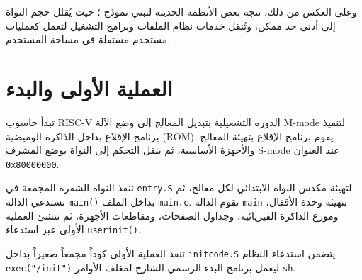 وعلى العكس من ذلك، تتجه بعض الأنظمة الحديثة لتبني نموذج ؛
حيث يُقلل حجم النواة إلى أدنى حد ممكن، وتُنقل خدمات نظام الملفات وبرامج التشغيل لتعمل كعمليات مستخدم مستقلة في مساحة المستخدم.

\section{العملية الأولى والبدء}

تبدأ حاسوب RISC-V الدورة التشغيلية بتبديل المعالج إلى وضع الآلة M-mode لتنفيذ برنامج الإقلاع بداخل الذاكرة الوميضية (ROM).
يقوم برنامج الإقلاع بتهيئة المعالج والأجهزة الأساسية، ثم ينقل التحكم إلى النواة بوضع المشرف S-mode عند العنوان \texttt{0x80000000}.

تنفذ النواة الشفرة المجمعة في \texttt{entry.S} لتهيئة مكدس النواة الابتدائي لكل معالج،
ثم تستدعي الدالة \texttt{main()} بداخل الملف \texttt{main.c}.
تقوم الدالة \texttt{main} بتهيئة وحدة الأقفال، وموزع الذاكرة الفيزيائية، وجداول الصفحات، ومقاطعات الأجهزة،
ثم تنشئ العملية الأولى عبر استدعاء \texttt{userinit()}.

تنفذ العملية الأولى كوداً مجمعاً صغيراً بداخل \texttt{initcode.S} يتضمن استدعاء النظام \texttt{exec("/init")} ليعمل برنامج البدء الرسمي الشارح لمغلف الأوامر \texttt{sh}.
